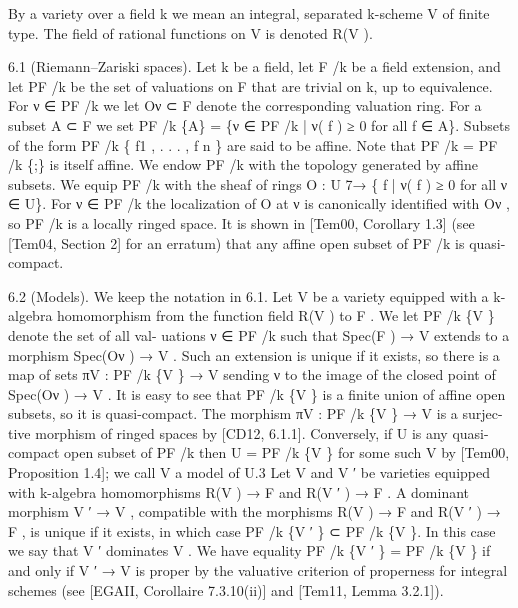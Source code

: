 \documentclass[
  10pt,
]{article}
\newenvironment{Shaded}{}{}
\newcommand{\NormalTok}[1]{#1}
\begin{document}
\begin{Shaded}
\begin{Highlighting}[]
\NormalTok{  By a variety over a field k we mean an integral, separated k{-}scheme V of finite type.}
\NormalTok{The field of rational functions on V is denoted R(V ).}

\NormalTok{6.1 (Riemann–Zariski spaces). Let k be a field, let F /k be a field extension, and let PF /k}
\NormalTok{be the set of valuations on F that are trivial on k, up to equivalence. For ν ∈ PF /k we let}
\NormalTok{Oν ⊂ F denote the corresponding valuation ring. For a subset A ⊂ F we set PF /k \{A\} = \{ν ∈}
\NormalTok{PF /k | ν( f ) ≥ 0 for all f ∈ A\}. Subsets of the form PF /k \{ f1 , . . . , f n \} are said to be affine.}
\NormalTok{Note that PF /k = PF /k \{;\} is itself affine. We endow PF /k with the topology generated by}
\NormalTok{affine subsets. We equip PF /k with the sheaf of rings O : U 7→ \{ f | ν( f ) ≥ 0 for all ν ∈ U\}.}
\NormalTok{For ν ∈ PF /k the localization of O at ν is canonically identified with Oν , so PF /k is a}
\NormalTok{locally ringed space. It is shown in [Tem00, Corollary 1.3] (see [Tem04, Section 2] for}
\NormalTok{an erratum) that any affine open subset of PF /k is quasi{-}compact.}

\NormalTok{6.2 (Models). We keep the notation in 6.1. Let V be a variety equipped with a k{-}algebra}
\NormalTok{homomorphism from the function field R(V ) to F . We let PF /k \{V \} denote the set of all val{-}}
\NormalTok{uations ν ∈ PF /k such that Spec(F ) → V extends to a morphism Spec(Oν ) → V . Such an}
\NormalTok{extension is unique if it exists, so there is a map of sets πV : PF /k \{V \} → V sending ν to the}
\NormalTok{image of the closed point of Spec(Oν ) → V . It is easy to see that PF /k \{V \} is a finite union}
\NormalTok{of affine open subsets, so it is quasi{-}compact. The morphism πV : PF /k \{V \} → V is a surjec{-}}
\NormalTok{tive morphism of ringed spaces by [CD12, 6.1.1]. Conversely, if U is any quasi{-}compact}
\NormalTok{open subset of PF /k then U = PF /k \{V \} for some such V by [Tem00, Proposition 1.4]; we}
\NormalTok{call V a model of U.3}
\NormalTok{   Let V and V ′ be varieties equipped with k{-}algebra homomorphisms R(V ) → F and}
\NormalTok{R(V ′ ) → F . A dominant morphism V ′ → V , compatible with the morphisms R(V ) → F}
\NormalTok{and R(V ′ ) → F , is unique if it exists, in which case PF /k \{V ′ \} ⊂ PF /k \{V \}. In this case}
\NormalTok{we say that V ′ dominates V . We have equality PF /k \{V ′ \} = PF /k \{V \} if and only if V ′ →}
\NormalTok{V is proper by the valuative criterion of properness for integral schemes (see [EGAII,}
\NormalTok{Corollaire 7.3.10(ii)] and [Tem11, Lemma 3.2.1]).}


\end{Highlighting}
\end{Shaded}
\end{document}
